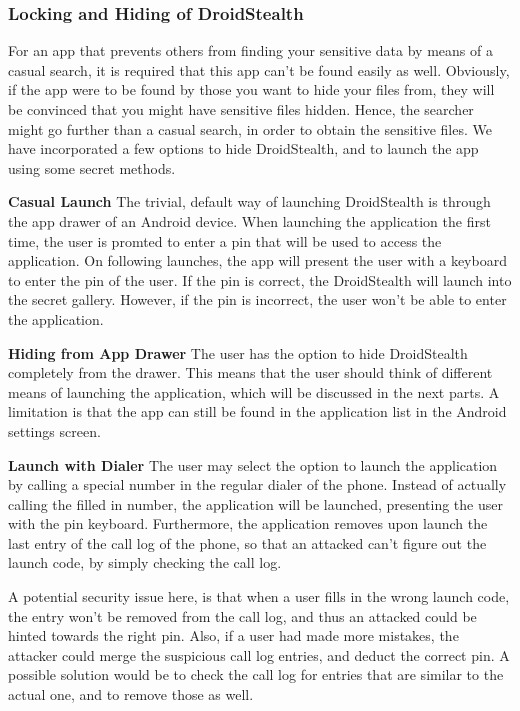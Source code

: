\subsubsection{Locking and Hiding of DroidStealth}

For an app that prevents others from finding your sensitive
data by means of a casual search, it is required that this app
can't be found easily as well. Obviously, if the app were to be
found by those you want to hide your files from, they will be
convinced that you might have sensitive files hidden. Hence, the
searcher might go further than a casual search, in order to
obtain the sensitive files. We have incorporated a few options to hide 
DroidStealth, and to launch the app using some secret methods.

\textbf{Casual Launch}
The trivial, default way of launching DroidStealth is through the app drawer of an Android device. 
When launching the application the first time, the user is promted to enter a pin that will be used to access the application.
On following launches, the app will present the user with a keyboard to enter the pin of the user. If the pin is correct, the 
DroidStealth will launch into the secret gallery. However, if the pin is incorrect, the user won't be able to enter the application.


\textbf{Hiding from App Drawer}
The user has the option to hide DroidStealth completely from the drawer. This 
means that the user should think of different means of launching the application, 
which will be discussed in the next parts. A limitation is that the app can still be found
in the application list in the Android settings screen. 

\textbf{Launch with Dialer}
The user may select the option to launch the application by calling a special number
in the regular dialer of the phone. Instead of actually calling the filled in number, the
application will be launched, presenting the user with the pin keyboard. Furthermore,
the application removes upon launch the last entry of the call log of the phone, so that
an attacked can't figure out the launch code, by simply checking the call log.

A potential security issue here, is that when a user fills in the wrong launch code, the 
entry won't be removed from the call log, and thus an attacked could be hinted towards
the right pin. Also, if a user had made more mistakes, the attacker could merge the 
suspicious call log entries, and deduct the correct pin. A possible solution would be to
check the call log for entries that are similar to the actual one, and to remove those as well.

